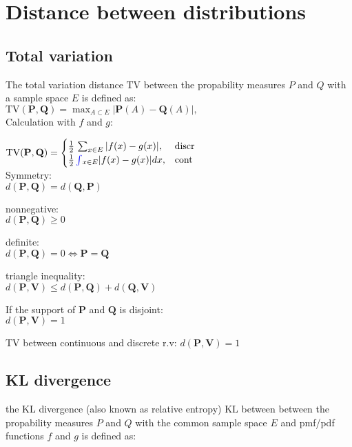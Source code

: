 \section{Distance between distributions}

\subsection*{Total variation}
The total variation distance $\text {TV}$ between the propability measures $P$ and $Q$ with a sample space $E$ is defined as:\\

$\text {TV}(\mathbf{P}, \mathbf{Q}) = {\max _{A \subset E}}| \mathbf{P}(A) - \mathbf{Q}(A) |,$\\

Calculation with $f$ and $g$:

$ \text {TV}(\mathbf{P}, \mathbf{Q}) =
	\begin{cases}
		  \frac{1}{2} \, \sum _{x \in E} |f(x) - g(x)|,&\text{discr}\\
		 
		 \frac{1}{2} \, {\color{blue}{\int }} _{x \in E} |f(x) - g(x)|dx,&\text{cont}\\
	\end{cases}
$\\

Symmetry:\\
 $d(\mathbf{P}, \mathbf{Q}) = d(\mathbf{Q}, \mathbf{P})$

nonnegative: \\
$d(\mathbf{P}, \mathbf{Q}) \geq 0$

definite:\\
$d(\mathbf{P}, \mathbf{Q}) = 0 \iff \mathbf{P}= \mathbf{Q}$

triangle inequality:\\
$d(\mathbf{P}, \mathbf{V}) \leq d(\mathbf{P}, \mathbf{Q}) + d(\mathbf{Q}, \mathbf{V})$

If the support of $\mathbf{P}$ and $\mathbf{Q}$ is disjoint:\\
$d(\mathbf{P}, \mathbf{V}) = 1$

TV between continuous and discrete r.v:
$d(\mathbf{P}, \mathbf{V}) = 1$

\subsection*{KL divergence}

the KL divergence (also known as relative entropy) $\text {KL}$ between between the propability measures $P$ and $Q$ with the common sample space $E$ and pmf/pdf functions $f$ and $g$ is defined as:

